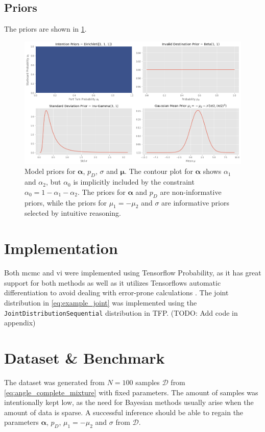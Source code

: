 \subsection{Priors}
The priors are shown in \cref{fig:priors}.
\begin{figure}
    \centering
    \includegraphics[width=1\textwidth]{figures/priors.png}
    \caption{Model priors for $\boldsymbol{\alpha}$, $p_D$, $\sigma$ and $\boldsymbol{\mu}$. The contour plot for $\boldsymbol{\alpha}$ shows $\alpha_1$ and $\alpha_2$, but $\alpha_0$ is implicitly included by the constraint $\alpha_0 = 1 - \alpha_1 - \alpha_2$. The priors for $\boldsymbol{\alpha}$ and $p_D$ are non-informative priors, while the priors for $\mu_1 = -\mu_2$ and $\sigma$ are informative priors selected by intuitive reasoning.}
    \label{fig:priors}
\end{figure}

\section{Implementation}
Both \acrshort{mcmc} and \acrshort{vi} were implemented using Tensorflow Probability, as it has great support for both methods as well as it utilizes Tensorflows automatic differentiation to avoid dealing with error-prone calculations \cite{tensorflow2015-whitepaper}. The joint distribution in \cref{eq:example_joint} was implemented using the \texttt{JointDistributionSequential} distribution in TFP. (TODO: Add code in appendix)


\section{Dataset \& Benchmark}
The dataset was generated from $N=100$ samples $\boldsymbol{\mathcal{D}}$ from \cref{eq:angle_complete_mixture} with fixed parameters. The amount of samples was intentionally kept low, as the need for Bayesian methods usually arise when the amount of data is sparse. A successful inference should be able to regain the parameters $\boldsymbol{\alpha}$, $p_D$, $\mu_1 = -\mu_2$ and $\sigma$ from $\mathcal{D}$.

